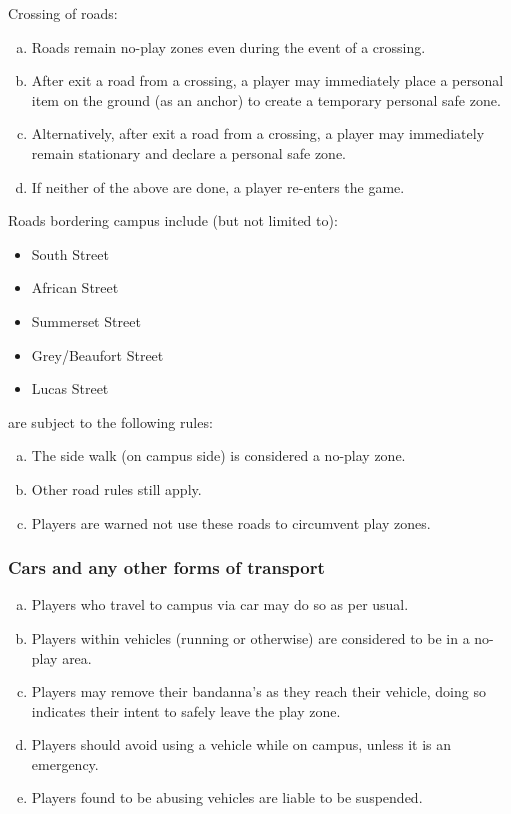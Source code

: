 \documentclass[a4paper,12pt]{article}
\begin{document}
Crossing of roads:
\begin{enumerate}[(a)]
    \item Roads remain no-play zones even during the event of a crossing.
    \item After exit a road from a crossing, a player may immediately place a personal item on the ground (as an anchor) to create a temporary personal safe zone.
    \item Alternatively, after exit a road from a crossing, a player may immediately remain stationary and declare a personal safe zone.
 	\item If neither of the above are done, a player re-enters the game.
\end{enumerate}

Roads bordering campus include (but not limited to):
\begin{itemize}
\item South Street
\item African Street
\item Summerset Street
\item Grey/Beaufort Street
\item Lucas Street
\end{itemize}
are subject to the following rules:
\begin{enumerate}[(a)]
\item The side walk (on campus side) is considered a no-play zone.
\item Other road rules still apply.
\item Players are warned not use these roads to circumvent play zones.
\end{enumerate}


\subsubsection{Cars and any other forms of transport}
\begin{enumerate}[(a)]
    \item Players who travel to campus via car may do so as per usual.
    \item Players within vehicles (running or otherwise) are considered to be in a no-play area.
    \item Players may remove their bandanna's as they reach their vehicle, doing so indicates their intent to safely leave the play zone.
    \item Players should avoid using a vehicle while on campus, unless it is an emergency.
    \item Players found to be abusing vehicles are liable to be suspended.
\end{enumerate}
\end{document}
